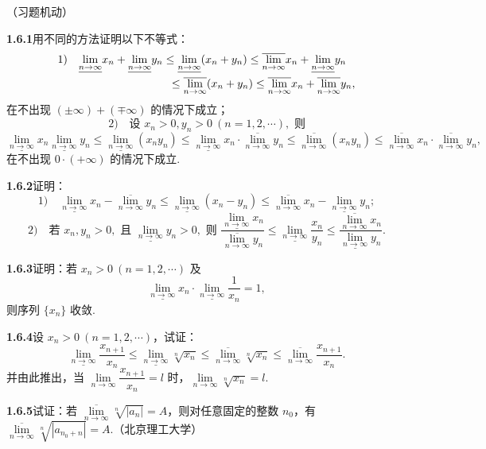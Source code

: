\documentclass[UTF8, 12pt, fontset=fandol, oneside]{ctexart}
\begin{document}
（习题机动）

\noindent\textbf{1.6.1}\quad 用不同的方法证明以下不等式：
\[
\begin{aligned}
  &1)\quad
  \underline{\lim_{n\to\infty}}x_n+\underline{\lim_{n\to\infty}}y_n
  \le \underline{\lim_{n\to\infty}}(x_n+y_n)
  \le \overline{\lim_{n\to\infty}}x_n+\underline{\lim_{n\to\infty}}y_n\\
  &\hspace{35mm}\le \overline{\lim_{n\to\infty}}(x_n+y_n)
  \le \overline{\lim_{n\to\infty}}x_n+\overline{\lim_{n\to\infty}}y_n,
\end{aligned}
\]
在不出现 $(\pm\infty)+(\mp\infty)$ 的情况下成立；
\[
  2)\quad \text{设 }x_n>0,y_n>0\ (n=1,2,\cdots),\text{ 则}
\]
\[
  \underline{\lim_{n\to\infty}}x_n\underline{\lim_{n\to\infty}}y_n
  \le \underline{\lim_{n\to\infty}}(x_ny_n)
  \le \underline{\lim_{n\to\infty}}x_n\cdot\overline{\lim_{n\to\infty}}y_n
  \le \overline{\lim_{n\to\infty}}(x_ny_n)
  \le \overline{\lim_{n\to\infty}}x_n\cdot\overline{\lim_{n\to\infty}}y_n,
\]
在不出现 $0\cdot(+\infty)$ 的情况下成立.

\noindent\textbf{1.6.2}\quad 证明：
\[
  1)\quad
  \underline{\lim_{n\to\infty}}x_n-\overline{\lim_{n\to\infty}}y_n
  \le \underline{\lim_{n\to\infty}}(x_n-y_n)
  \le \overline{\lim_{n\to\infty}}x_n-\underline{\lim_{n\to\infty}}y_n;
\]
\[
  2)\quad \text{若 }x_n,y_n>0,\text{ 且 }\underline{\lim_{n\to\infty}}y_n>0,\text{ 则 }
  \frac{\underline{\lim\limits_{n\to\infty}}x_n}{\overline{\lim\limits_{n\to\infty}}y_n}
  \le \underline{\lim_{n\to\infty}}\frac{x_n}{y_n}
  \le \frac{\overline{\lim\limits_{n\to\infty}}x_n}{\underline{\lim\limits_{n\to\infty}}y_n}.
\]

\noindent\textbf{1.6.3}\quad 证明：若 $x_n>0\ (n=1,2,\cdots)$ 及
\[
  \underline{\lim_{n\to\infty}}x_n\cdot\underline{\lim_{n\to\infty}}\frac1{x_n}=1,
\]
则序列 $\{x_n\}$ 收敛.

\noindent\textbf{1.6.4}\quad 设 $x_n>0\ (n=1,2,\cdots)$，试证：
\[
  \underline{\lim_{n\to\infty}}\frac{x_{n+1}}{x_n}
  \le \underline{\lim_{n\to\infty}}\sqrt[n]{x_n}
  \le \overline{\lim_{n\to\infty}}\sqrt[n]{x_n}
  \le \overline{\lim_{n\to\infty}}\frac{x_{n+1}}{x_n}.
\]
并由此推出，当 $\lim\limits_{n\to\infty}\dfrac{x_{n+1}}{x_n}=l$ 时，$\lim\limits_{n\to\infty}\sqrt[n]{x_n}=l$.

\noindent\textbf{1.6.5}\quad 试证：若 $\overline{\lim\limits_{n\to\infty}}\sqrt[n]{|a_n|}=A$，则对任意固定的整数 $n_0$，有 $\overline{\lim\limits_{n\to\infty}}\sqrt[n]{|a_{n_0+n}|}=A$.（北京理工大学）
\end{document}
